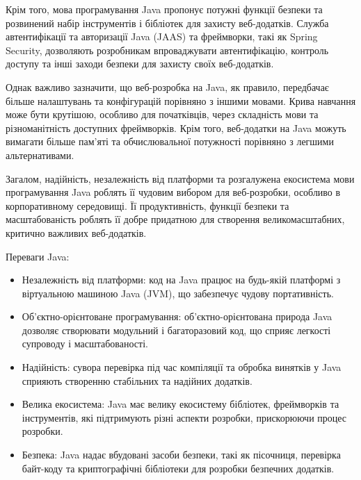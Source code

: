 Крім того, мова програмування Java пропонує потужні функції безпеки та розвинений набір інструментів і бібліотек для захисту веб-додатків. Служба автентифікації та авторизації Java (JAAS) та фреймворки, такі як Spring Security, дозволяють розробникам впроваджувати автентифікацію, контроль доступу та інші заходи безпеки для захисту своїх веб-додатків.

Однак важливо зазначити, що веб-розробка на Java, як правило, передбачає більше налаштувань та конфігурацій порівняно з іншими мовами. Крива навчання може бути крутішою, особливо для початківців, через складність мови та різноманітність доступних фреймворків. Крім того, веб-додатки на Java можуть вимагати більше пам'яті та обчислювальної потужності порівняно з легшими альтернативами.

Загалом, надійність, незалежність від платформи та розгалужена екосистема мови програмування Java роблять її чудовим вибором для веб-розробки, особливо в корпоративному середовищі. Її продуктивність, функції безпеки та масштабованість роблять її добре придатною для створення великомасштабних, критично важливих веб-додатків.

Переваги Java:
\begin{itemize}
    \item Незалежність від платформи: код на Java працює на будь-якій платформі з віртуальною машиною Java (JVM), що забезпечує чудову портативність.
    \item Об'єктно-орієнтоване програмування: об'єктно-орієнтована природа Java дозволяє створювати модульний і багаторазовий код, що сприяє легкості супроводу і масштабованості.
    \item Надійність: сувора перевірка під час компіляції та обробка винятків у Java сприяють створенню стабільних та надійних додатків.
    \item Велика екосистема: Java має велику екосистему бібліотек, фреймворків та інструментів, які підтримують різні аспекти розробки, прискорюючи процес розробки.
    \item Безпека: Java надає вбудовані засоби безпеки, такі як пісочниця, перевірка байт-коду та криптографічні бібліотеки для розробки безпечних додатків.
\end{itemize}

